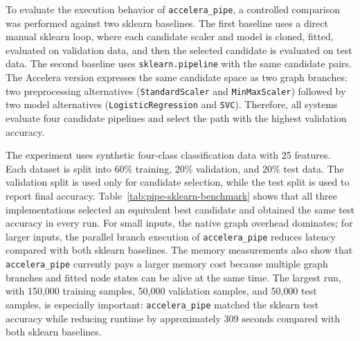 \documentclass[11pt,a4paper]{article}
\newcommand{\project}{Accelera}
\begin{document}
To evaluate the execution behavior of \texttt{accelera\_pipe}, a controlled
comparison was performed against two sklearn baselines. The first baseline
uses a direct manual sklearn loop, where each candidate scaler and model is
cloned, fitted, evaluated on validation data, and then the selected candidate
is evaluated on test data. The second baseline uses \texttt{sklearn.pipeline}
with the same candidate pairs. The \project{} version expresses the same
candidate space as two graph branches: two preprocessing alternatives
(\texttt{StandardScaler} and \texttt{MinMaxScaler}) followed by two model
alternatives (\texttt{LogisticRegression} and \texttt{SVC}). Therefore, all
systems evaluate four candidate pipelines and select the path with the highest
validation accuracy.

The experiment uses synthetic four-class classification data with 25 features.
Each dataset is split into 60\% training, 20\% validation, and 20\% test data.
The validation split is used only for candidate selection, while the test
split is used to report final accuracy. Table~\ref{tab:pipe-sklearn-benchmark}
shows that all three implementations selected an equivalent best candidate and
obtained the same test accuracy in every run. For small inputs, the native
graph overhead dominates; for larger inputs, the parallel branch execution of
\texttt{accelera\_pipe} reduces latency compared with both sklearn baselines.
The memory measurements also show that \texttt{accelera\_pipe} currently pays
a larger memory cost because multiple graph branches and fitted node states
can be alive at the same time. The largest run, with 150{,}000 training
samples, 50{,}000 validation samples, and 50{,}000 test samples, is especially
important: \texttt{accelera\_pipe} matched the sklearn test accuracy while
reducing runtime by approximately 309 seconds compared with both sklearn
baselines.
\end{document}
